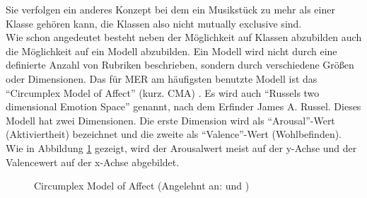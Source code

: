 \documentclass[11pt,a4paper]{article}
\begin{document}
Sie verfolgen ein anderes Konzept bei dem ein Musikstück zu mehr als einer Klasse gehören kann, die Klassen also nicht mutually exclusive sind.\\
Wie schon angedeutet besteht neben der Möglichkeit auf Klassen abzubilden auch die Möglichkeit auf ein Modell abzubilden. Ein Modell wird nicht durch eine definierte Anzahl von Rubriken beschrieben, sondern durch verschiedene Größen oder Dimensionen. Das für MER am häufigsten benutzte Modell ist das ``Circumplex Model of Affect'' (kurz. CMA) \cite[S. 158 f.]{lerch2012introduction}. Es wird auch ``Russels two dimensional Emotion Space'' genannt, nach dem Erfinder James A. Russel\cite{russell1980circumplex}. Dieses Modell hat zwei Dimensionen. Die erste Dimension wird als ``Arousal''-Wert (Aktiviertheit) bezeichnet und die zweite als ``Valence''-Wert (Wohlbefinden). Wie in Abbildung \ref{fig:CMA} gezeigt, wird der Arousalwert meist auf der y-Achse und der Valencewert auf der x-Achse abgebildet.
\begin{center}
\begin{figure}[!ht]
\centering
{}
\caption[Circumplex Model of Affect]{Circumplex Model of Affect (Angelehnt an:\cite[S. 4]{8a02f9c512933d46fbea928d23ac65e38b61b88caba9b38319a5d4952b5a6667} und \cite[S. 7]{russell1980circumplex})}
\label{fig:CMA}
\end{figure}
\end{center}
\end{document}

